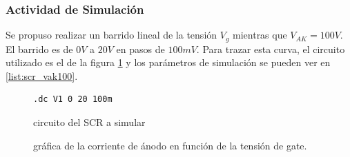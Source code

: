       \subsubsection{Actividad de Simulación}
        Se propuso realizar un barrido lineal de la tensión $V_g$ mientras que $V_{AK} = 100V$. El barrido es de $0V$ a
        $20V$ en pasos de $100mV$. Para trazar esta curva, el circuito utilizado es el de la figura \ref{crkt:scr_vak100}
        y los parámetros de simulación se pueden ver en \ref{list:scr_vak100}.
        \begin{figure}[!ht]
          \centering
          \begin{minipage}{0.45\textwidth}
            \centering
            
            \caption{circuito del SCR a simular}
            \label{crkt:scr_vak100}
          \end{minipage}
          \hfill
          \begin{minipage}{0.45\textwidth}
            \centering
          \begin{lstlisting}[style=ltspice, caption={Parámetros de simulación LTspice}, label=list:scr_vak100]
.dc V1 0 20 100m
          \end{lstlisting}
          \end{minipage}
        \end{figure}

        \begin{figure}[!ht]
            \caption{gráfica de la corriente de ánodo en función de la tensión de gate.}
            \label{graph:scr_iak_vg_vak100}
        \end{figure}

